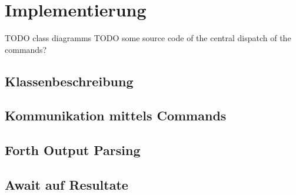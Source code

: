 \section{Implementierung}

TODO class diagramms
TODO some source code of the central dispatch of the commands?

\subsection{Klassenbeschreibung}

\subsection{Kommunikation mittels Commands}

\subsection{Forth Output Parsing}

\subsection{Await auf Resultate}

